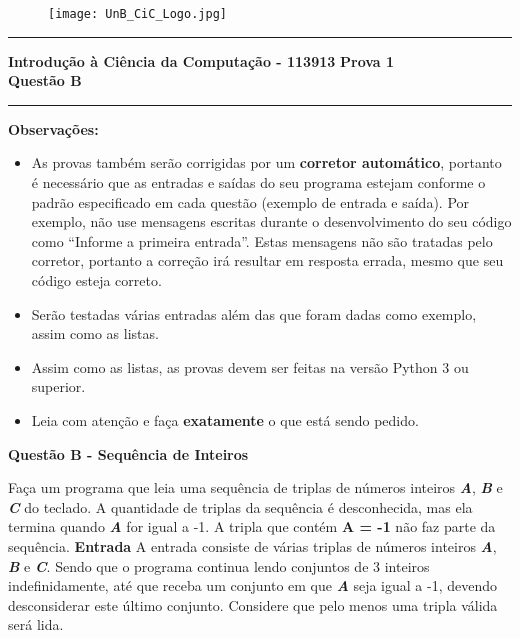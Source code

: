 \documentclass[a4paper, 12pt]{article}
\begin{document}
\begin{figure}[H]
	\texttt{[image: UnB\_CiC\_Logo.jpg]}
\end{figure}
\noindent\rule{\textwidth}{0.4pt}
\begin{center}
	\textbf{{\Large Introdução à Ciência da Computação - 113913}} \newline \newline
	\textbf{{\large Prova 1} \\
	\vspace{9pt}
	{\large Questão B}} \\
	\noindent\rule{\textwidth}{0.4pt}
	\newline
\end{center}

\textbf{{\large Observações:}}
\begin{itemize}
	\item As provas também serão corrigidas por um \textbf{corretor automático}, portanto é necessário que as entradas e saídas do seu programa estejam conforme o padrão especificado em cada questão (exemplo de entrada e saída). Por exemplo, não use mensagens escritas durante o desenvolvimento do seu código como “Informe a primeira entrada”. Estas mensagens não são tratadas pelo corretor, portanto a correção irá resultar em resposta errada, mesmo que seu código esteja correto.
	\item Serão testadas várias entradas além das que foram dadas como exemplo, assim como as listas.
	\item Assim como as listas, as provas devem ser feitas na versão Python 3 ou superior.
	\item Leia com atenção e faça \textbf{exatamente} o que está sendo pedido.
\end{itemize}
\newpage %
\begin{center}
\textbf{{\Large Questão B - Sequência de Inteiros}}
\end{center}
\vspace{5pt}
Faça um programa que leia uma sequência de triplas de números inteiros \textbf{\textit{A}}, \textbf{\textit{B}} e \textbf{\textit{C}} do teclado. A quantidade de triplas da sequência é desconhecida, mas ela termina quando \textbf{\textit{A}} for igual a -1. A tripla que contém \textbf{A = -1} não faz parte da sequência.
\newline \newline
\textbf{{\large Entrada}} \newline
A entrada consiste de várias triplas de números inteiros  \textbf{\textit{A}}, \textbf{\textit{B}} e \textbf{\textit{C}}. Sendo que o programa continua lendo conjuntos de 3 inteiros indefinidamente, até que receba um conjunto em que \textbf{\textit{A}} seja igual a -1, devendo desconsiderar este último conjunto. Considere que pelo menos uma tripla válida será lida.
\end{document}
